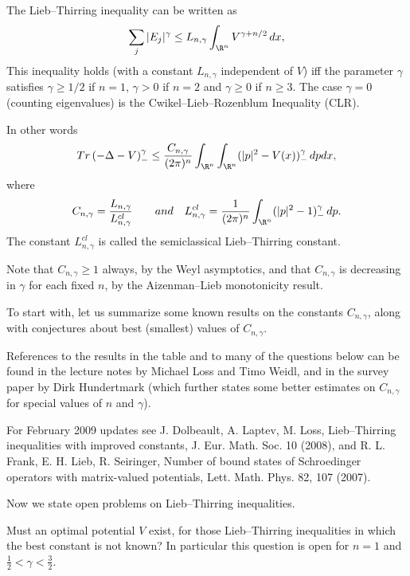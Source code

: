 \documentclass[12pt,letterpaper, reqno]{amsart}
\begin{document}
The Lieb--Thirring inequality can be written as
\[
\sum_j |E_j|^\gamma \leq L_{n,\gamma} \int_{\R^n} V^{\gamma + n/2} \,
dx ,
\]
This inequality holds (with a constant $L_{n,\gamma}$ independent of $V$) iff the parameter $\gamma$ satisfies $\gamma\geq 1/2$ if $n=1$, $\gamma>0$ if $n=2$ and $\gamma\geq 0$ if $n\geq 3$. The case $\gamma = 0$ (counting eigenvalues)
is the Cwikel--Lieb--Rozenblum Inequality (CLR).

In other words
\[
{Tr} \left( -\Delta - V \right)_-^\gamma \leq
\frac{C_{n,\gamma}}{(2\pi)^n} \int_{\R^n} \int_{\R^n} (|p|^2 -
V(x))_-^\gamma \, dp dx ,
\]
where
\[
C_{n,\gamma} = \frac{L_{n,\gamma}}{L^{cl}_{n,\gamma}} \qquad
{ and } \quad L^{cl}_{n,\gamma} = \frac{1}{(2\pi)^n}
\int_{\R^n} (|p|^2-1)_-^\gamma \, dp .
\]
The constant $L^{cl}_{n,\gamma}$ is called the semiclassical
Lieb--Thirring constant.

Note that $C_{n,\gamma} \geq 1$ always, by the Weyl asymptotics, and
that $C_{n,\gamma}$ is decreasing in $\gamma$ for each fixed $n$, by
the Aizenman--Lieb monotonicity result.

To start with, let us summarize some known results on the constants
$C_{n,\gamma}$, along with conjectures about best (smallest) values
of $C_{n,\gamma}$.


References to the results in the table and
to many of the questions below can be found in the lecture notes by
Michael Loss and Timo Weidl, and in the survey paper by Dirk
Hundertmark (which further states some better estimates on
$C_{n,\gamma}$ for special values of $n$ and $\gamma$).

For February 2009 updates see J. Dolbeault, A. Laptev, M. Loss, Lieb--Thirring inequalities with improved constants, J. Eur. Math. Soc. 10 (2008), and R. L. Frank, E. H. Lieb, R. Seiringer, Number of bound states of Schroedinger operators with matrix-valued potentials, Lett. Math. Phys. 82, 107 (2007).

Now we state open problems on Lieb--Thirring
inequalities.



\begin{problemblock}
\begin{problem}[2.1] 
Must an optimal potential $V$ exist, for
those Lieb--Thirring inequalities in which the best constant is not
known? In particular this question is open for $n=1$ and
$\frac{1}{2} < \gamma < \frac{3}{2}$.
\end{problem}
\end{problemblock}
\end{document}
